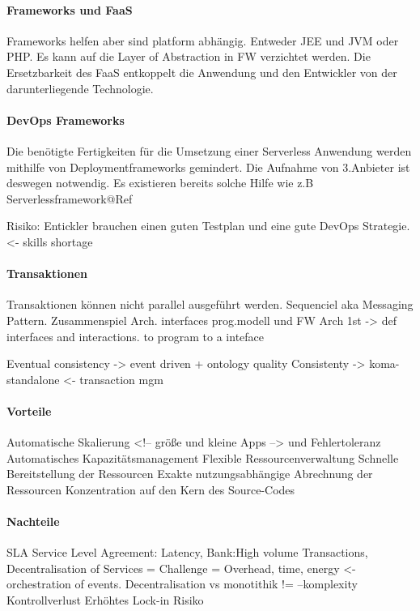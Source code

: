 \documentclass[
12pt,
english,
ngerman,
headsepline,
twoside,
openright,
numbers=noenddot,version=first
]{scrreprt}
\begin{document}
\paragraph{Frameworks und FaaS}
Frameworks helfen aber sind platform abhängig. Entweder JEE und JVM oder PHP.
Es kann auf die Layer of Abstraction in FW verzichtet werden. 
Die Ersetzbarkeit des FaaS entkoppelt die Anwendung und den Entwickler von der darunterliegende Technologie.

\paragraph{DevOps Frameworks}
Die benötigte Fertigkeiten für die Umsetzung einer Serverless Anwendung werden mithilfe von Deploymentframeworks gemindert. Die Aufnahme von 3.Anbieter ist deswegen notwendig. Es existieren bereits solche Hilfe wie z.B Serverlessframework@Ref

Risiko:
Entickler brauchen einen guten Testplan und eine gute DevOps Strategie.<- skills shortage

\paragraph{Transaktionen}
Transaktionen können nicht parallel ausgeführt werden. Sequenciel aka Messaging Pattern.
Zusammenspiel Arch. interfaces prog.modell und FW
Arch 1st -> def interfaces and interactions. to program to a inteface


Eventual consistency -> event driven + ontology quality
Consistenty -> koma-standalone <- transaction mgm

\paragraph{Vorteile}
Automatische Skalierung <!-- größe und kleine Apps --> und Fehlertoleranz
Automatisches Kapazitätsmanagement
Flexible Ressourcenverwaltung
Schnelle Bereitstellung der Ressourcen
Exakte nutzungsabhängige Abrechnung der Ressourcen
Konzentration auf den Kern des Source-Codes


\paragraph{Nachteile}


SLA Service Level Agreement: Latency, Bank:High volume Transactions,
Decentralisation of Services = Challenge = Overhead, time, energy <- orchestration of events.
Decentralisation vs monotithik != --komplexity
Kontrollverlust
Erhöhtes Lock-in Risiko
\end{document}
